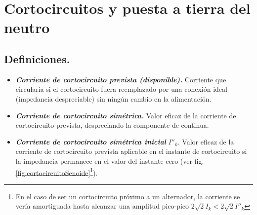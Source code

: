 \chapter{Cortocircuitos y puesta a tierra del neutro}
    \section{Definiciones.}
        \begin{itemize}
            \item \textbf{\textit{Corriente de cortocircuito prevista (disponible).}} Corriente que circularía si el cortocircuito fuera reemplazado por una conexión ideal (impedancia despreciable) sin ningún cambio en la alimentación.
            \item \textbf{\textit{Corriente de cortocircuito simétrica.}} Valor eficaz de la corriente de cortocircuito prevista, despreciando la componente de continua. 
            \item \textbf{\textit{Corriente de cortocircuito simétrica inicial}} $I''_k$. Valor eficaz de la corriente de cortocircuito prevista aplicable en el instante de cortocircuito si la impedancia permanece en el valor del instante cero (ver fig. \ref{fig:cortocircuitoSenoide}\footnote{En el caso de ser un cortocircuito próximo a un alternador, la corriente se vería amortiguada hasta alcanzar una amplitud pico-pico $2\sqrt{2}I_\textit{k} < 2\sqrt{2}I''_\textit{k}$}). 
            

\end{itemize}
